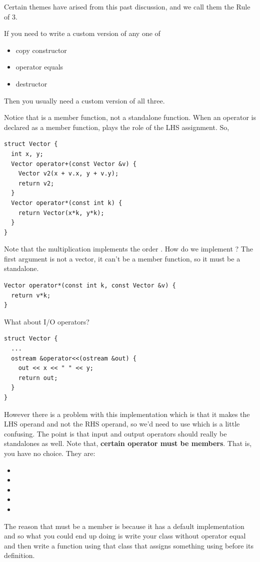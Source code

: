 \documentclass[english, 11pt]{article}
\begin{document}
Certain themes have arised from this past discussion, and we call them the Rule of 3.
\begin{defn}[rule of 3]\label{rule of 3}
If you need to write a custom version of any one of
\begin{itemize}
  \item copy constructor
  \item operator equals
  \item destructor
\end{itemize}
Then you usually need a custom version of all three.
\end{defn}
Notice that  is a member function, not a standalone function. When an operator is declared as a member function,  plays the role of the LHS assignment. So,
\begin{lstlisting}
struct Vector {
  int x, y;
  Vector operator+(const Vector &v) {
    Vector v2(x + v.x, y + v.y);
    return v2;
  }
  Vector operator*(const int k) {
    return Vector(x*k, y*k);
  }
}
\end{lstlisting}
Note that the multiplication implements the order . How do we implement ? The first argument is not a vector, it can't be a member function, so it must be a standalone.
\begin{lstlisting}
Vector operator*(const int k, const Vector &v) {
  return v*k;
}
\end{lstlisting}
What about I/O operators?
\begin{lstlisting}
struct Vector {
  ...
  ostream &operator<<(ostream &out) {
    out << x << " " << y;
    return out;
  }
}
\end{lstlisting}
However there is a problem with this implementation which is that it makes  the LHS operand and not the RHS operand, so we'd need to use  which is a little confusing. The point is that input and output operators should really be standalones as well. Note that, \textbf{certain operator must be members}. That is, you have no choice. They are:
\begin{itemize}
  \item {}
  \item {}
  \item {}
  \item {}
  \item {}
\end{itemize}
The reason that  must be a member is because it has a default implementation and so what you could end up doing is write your class without operator equal and then write a function using that class that assigns something using  before its definition.
\end{document}
